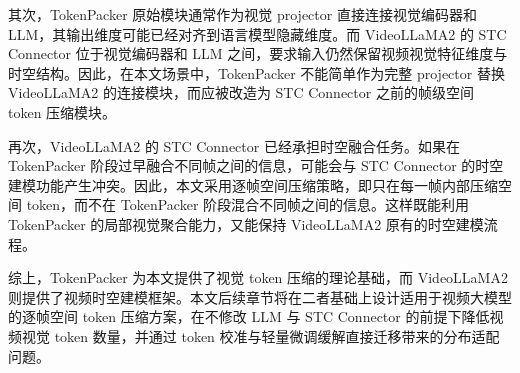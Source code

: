 其次，TokenPacker 原始模块通常作为视觉 projector 直接连接视觉编码器和 LLM，其输出维度可能已经对齐到语言模型隐藏维度。而 VideoLLaMA2 的 STC Connector 位于视觉编码器和 LLM 之间，要求输入仍然保留视频视觉特征维度与时空结构。因此，在本文场景中，TokenPacker 不能简单作为完整 projector 替换 VideoLLaMA2 的连接模块，而应被改造为 STC Connector 之前的帧级空间 token 压缩模块。

再次，VideoLLaMA2 的 STC Connector 已经承担时空融合任务。如果在 TokenPacker 阶段过早融合不同帧之间的信息，可能会与 STC Connector 的时空建模功能产生冲突。因此，本文采用逐帧空间压缩策略，即只在每一帧内部压缩空间 token，而不在 TokenPacker 阶段混合不同帧之间的信息。这样既能利用 TokenPacker 的局部视觉聚合能力，又能保持 VideoLLaMA2 原有的时空建模流程。

综上，TokenPacker 为本文提供了视觉 token 压缩的理论基础，而 VideoLLaMA2 则提供了视频时空建模框架。本文后续章节将在二者基础上设计适用于视频大模型的逐帧空间 token 压缩方案，在不修改 LLM 与 STC Connector 的前提下降低视频视觉 token 数量，并通过 token 校准与轻量微调缓解直接迁移带来的分布适配问题。